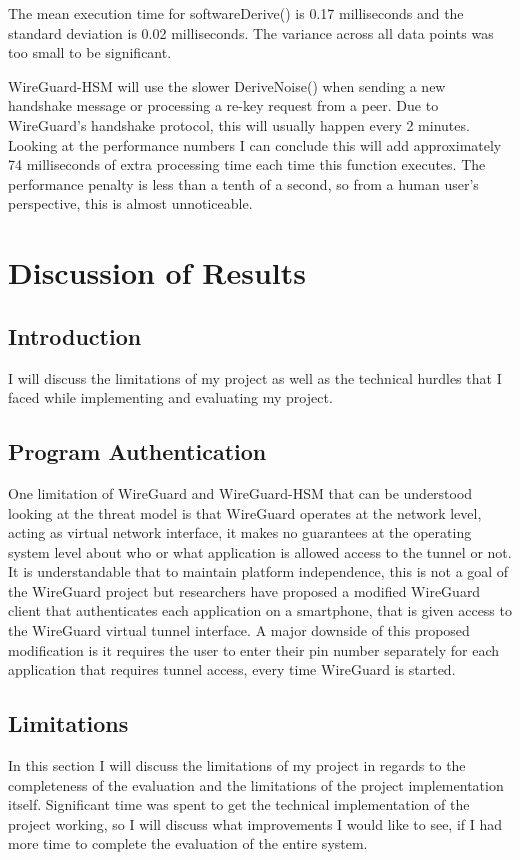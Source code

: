 \documentclass [11pt, proquest] {uwthesis}[2020/02/24]
\begin{document}
The mean execution time for softwareDerive() is 0.17 milliseconds and the standard deviation is 0.02 milliseconds. The variance across all data points was too small to be significant.

WireGuard-HSM will use the slower DeriveNoise() when sending a new handshake message or processing a re-key request from a peer. Due to WireGuard's handshake protocol, this will usually happen every 2 minutes. Looking at the performance numbers I can conclude this will add approximately 74 milliseconds of extra processing time each time this function executes. The performance penalty is less than a tenth of a second, so from a human user's perspective, this is almost unnoticeable. 

\chapter {Discussion of Results}
\section {Introduction}
I will discuss the limitations of my project as well as the technical hurdles that I faced while implementing and evaluating my project.

\section{Program Authentication}
One limitation of WireGuard and WireGuard-HSM that can be understood looking at the threat model is that WireGuard operates at the network level, acting as virtual network interface, it makes no guarantees at the operating system level about who or what application is allowed access to the tunnel or not. It is understandable that to maintain platform independence, this is not a goal of the WireGuard project but researchers have proposed a modified WireGuard client that authenticates each application on a smartphone, that is given access to the WireGuard virtual tunnel interface. A major downside of this proposed modification is it requires the user to enter their pin number separately for each application that requires tunnel access, every time WireGuard is started.\cite{wu_sewg_2020}

\section {Limitations}
In this section I will discuss the limitations of my project in regards to the completeness of the evaluation and the limitations of the project implementation itself. Significant time was spent to get the technical implementation of the project working, so I will discuss what improvements I would like to see, if I had more time to complete the evaluation of the entire system.
\end{document}
